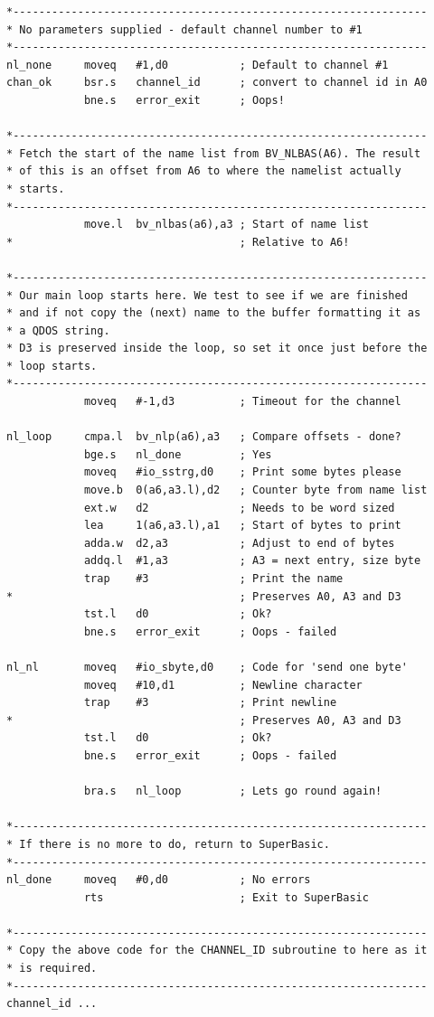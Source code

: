 \begin{lstlisting}[firstnumber=1,caption={Procedure to Print the Entire Name List},label={lst:NlistProcedure}]
*----------------------------------------------------------------
* No parameters supplied - default channel number to #1
*----------------------------------------------------------------
nl_none     moveq   #1,d0           ; Default to channel #1
chan_ok     bsr.s   channel_id      ; convert to channel id in A0
            bne.s   error_exit      ; Oops!

*----------------------------------------------------------------
* Fetch the start of the name list from BV_NLBAS(A6). The result 
* of this is an offset from A6 to where the namelist actually 
* starts.
*----------------------------------------------------------------
            move.l  bv_nlbas(a6),a3 ; Start of name list 
*                                   ; Relative to A6!

*----------------------------------------------------------------
* Our main loop starts here. We test to see if we are finished 
* and if not copy the (next) name to the buffer formatting it as 
* a QDOS string. 
* D3 is preserved inside the loop, so set it once just before the 
* loop starts.
*----------------------------------------------------------------
            moveq   #-1,d3          ; Timeout for the channel

nl_loop     cmpa.l  bv_nlp(a6),a3   ; Compare offsets - done?
            bge.s   nl_done         ; Yes
            moveq   #io_sstrg,d0    ; Print some bytes please
            move.b  0(a6,a3.l),d2   ; Counter byte from name list
            ext.w   d2              ; Needs to be word sized
            lea     1(a6,a3.l),a1   ; Start of bytes to print
            adda.w  d2,a3           ; Adjust to end of bytes
            addq.l  #1,a3           ; A3 = next entry, size byte
            trap    #3              ; Print the name 
*                                   ; Preserves A0, A3 and D3
            tst.l   d0              ; Ok?
            bne.s   error_exit      ; Oops - failed

nl_nl       moveq   #io_sbyte,d0    ; Code for 'send one byte'
            moveq   #10,d1          ; Newline character
            trap    #3              ; Print newline
*                                   ; Preserves A0, A3 and D3
            tst.l   d0              ; Ok?
            bne.s   error_exit      ; Oops - failed

            bra.s   nl_loop         ; Lets go round again!

*----------------------------------------------------------------
* If there is no more to do, return to SuperBasic.
*----------------------------------------------------------------
nl_done     moveq   #0,d0           ; No errors
            rts                     ; Exit to SuperBasic

*----------------------------------------------------------------
* Copy the above code for the CHANNEL_ID subroutine to here as it
* is required.
*----------------------------------------------------------------
channel_id ...
\end{lstlisting}

